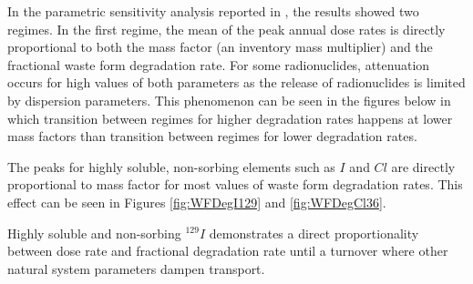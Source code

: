 In the parametric sensitivity analysis reported in \cite{huff_key_2012}, the
results showed two regimes. In the first regime, the mean of the peak annual
dose rates is directly proportional to both the mass factor (an inventory mass
multiplier) and the fractional waste form degradation rate. For some
radionuclides, attenuation occurs for high values of both parameters as the
release of radionuclides is limited by dispersion parameters. This phenomenon
can be seen in the figures below in which transition between regimes for higher
degradation rates happens at lower mass factors than transition between regimes
for lower degradation rates.

The peaks for highly soluble, non-sorbing elements such as $I$ and $Cl$
are directly proportional to mass factor for most
values of waste form degradation rates. This effect can be seen in Figures
\ref{fig:WFDegI129} and \ref{fig:WFDegCl36}.


Highly soluble and non-sorbing $^{129}I$ demonstrates a direct proportionality between dose rate and
fractional degradation rate until a turnover where other natural system
parameters dampen transport.

